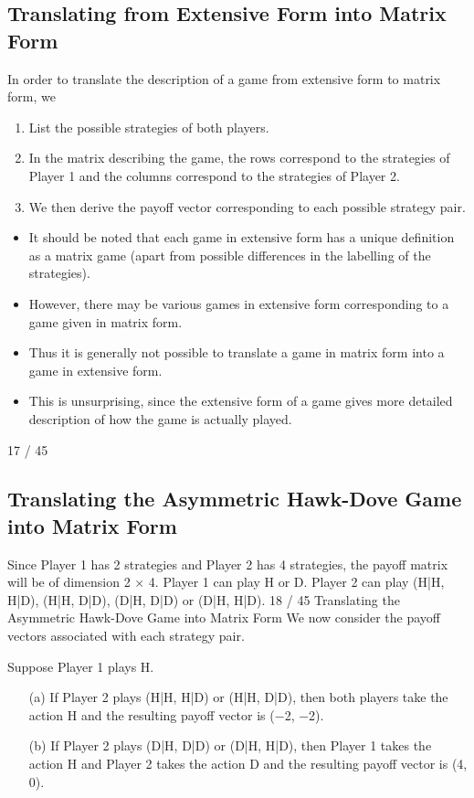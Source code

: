 \documentclass[]{report}
\begin{document}
\subsection{Translating from Extensive Form into Matrix Form}
In order to translate the description of a game from extensive form
to matrix form, we
\begin{enumerate}
\item  List the possible strategies of both players.
\item In the matrix describing the game, the rows
correspond to the strategies of Player 1 and the
columns correspond to the strategies of Player 2.
\item We then derive the payoff vector corresponding to
each possible strategy pair.
\end{enumerate}
\begin{itemize}
	\item It should be noted that each game in extensive form has a unique
	definition as a matrix game (apart from possible differences in the
	labelling of the strategies).
\item However, there may be various games in extensive form
	corresponding to a game given in matrix form. 
\item Thus it is generally
	not possible to translate a game in matrix form into a game in
	extensive form.
\item This is unsurprising, since the extensive form of a game gives more
	detailed description of how the game is actually played.
\end{itemize}


17 / 45
\subsection{Translating the Asymmetric Hawk-Dove Game into Matrix
Form}
Since Player 1 has 2 strategies and Player 2 has 4 strategies, the
payoff matrix will be of dimension 2 × 4.
Player 1 can play H or D.
Player 2 can play (H|H, H|D), (H|H, D|D), (D|H, D|D) or
(D|H, H|D).
18 / 45
Translating the Asymmetric Hawk-Dove Game into Matrix
Form
We now consider the payoff vectors associated with each strategy
pair.
\begin{framed}
Suppose Player 1 plays H.
\begin{itemize}
	\item [(a)] If Player 2 plays (H|H, H|D) or (H|H, D|D), then both players
take the action H and the resulting payoff vector is (−2, −2).
	\item [(b)] If Player 2 plays (D|H, D|D) or (D|H, H|D), then Player 1
takes the action H and Player 2 takes the action D and the
resulting payoff vector is (4, 0).
\end{itemize}
\end{framed}
\end{document}
